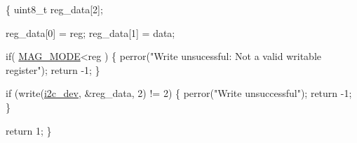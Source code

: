 \begin{DoxyCode}
\{
  uint8\_t reg\_data[2];

  reg\_data[0] = reg;
  reg\_data[1] = data;

  \textcolor{keywordflow}{if}( \hyperlink{communication_2imu__regs_8h_a0173afba6efc0e164495bf506a9758d2}{MAG\_MODE}<reg )
  \{
      perror(\textcolor{stringliteral}{"Write unsucessful: Not a valid writable register"});
      \textcolor{keywordflow}{return} -1;
  \}
        
  \textcolor{keywordflow}{if} (write(\hyperlink{CommunicationV0_2communication_8c_a7751bd45ac1064efb35adf1f19c25db8}{i2c\_dev}, &reg\_data, 2) != 2) \{                
          perror(\textcolor{stringliteral}{"Write unsuccessful"});
          \textcolor{keywordflow}{return} -1;
  \}

  \textcolor{keywordflow}{return} 1;
\}
\end{DoxyCode}
